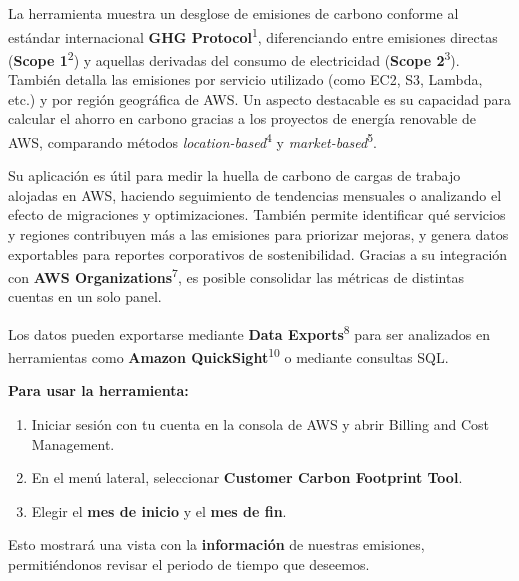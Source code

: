 \documentclass[12pt,a4paper]{report}
\begin{document}
La herramienta muestra un desglose de emisiones de carbono conforme al estándar internacional \textbf{GHG Protocol}\textsuperscript{1}, diferenciando entre emisiones directas (\textbf{Scope 1}\textsuperscript{2}) y aquellas derivadas del consumo de electricidad (\textbf{Scope 2}\textsuperscript{3}). También detalla las emisiones por servicio utilizado (como EC2, S3, Lambda, etc.) y por región geográfica de AWS. Un aspecto destacable es su capacidad para calcular el ahorro en carbono gracias a los proyectos de energía renovable de AWS, comparando métodos \textit{location-based}\textsuperscript{4} y \textit{market-based}\textsuperscript{5}.

Su aplicación es útil para medir la huella de carbono de cargas de trabajo alojadas en AWS, haciendo seguimiento de tendencias mensuales o analizando el efecto de migraciones y optimizaciones. También permite identificar qué servicios y regiones contribuyen más a las emisiones para priorizar mejoras, y genera datos exportables para reportes corporativos de sostenibilidad. Gracias a su integración con \textbf{AWS Organizations}\textsuperscript{7}, es posible consolidar las métricas de distintas cuentas en un solo panel.

Los datos pueden exportarse mediante \textbf{Data Exports}\textsuperscript{8} para ser analizados en herramientas como \textbf{Amazon QuickSight}\textsuperscript{10} o mediante consultas SQL.

\textbf{Para usar la herramienta:}

\begin{enumerate}
  \item Iniciar sesión con tu cuenta en la consola de AWS y abrir Billing and Cost Management.
  \item En el menú lateral, seleccionar \textbf{Customer Carbon Footprint Tool}.
  \item Elegir el \textbf{mes de inicio} y el \textbf{mes de fin}.
\end{enumerate}

Esto mostrará una vista con la \textbf{información} de nuestras emisiones, permitiéndonos revisar el periodo de tiempo que deseemos.
\end{document}
